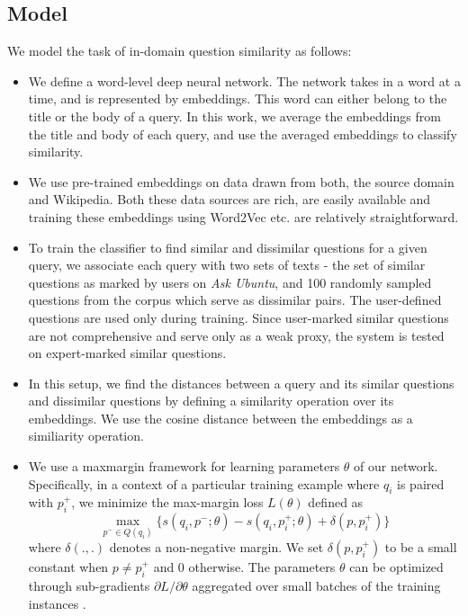 \documentclass{sigkddExp}
\begin{document}
\subsection{Model}
We model the task of in-domain question similarity as follows:
\begin{itemize}[topsep=0pt,itemsep=-1ex,partopsep=1ex,parsep=1ex]
  \item We define a word-level deep neural network. The network takes in a word at a time, and is represented by embeddings.  This word can either belong to the title or the body of a query. In this work, we average the embeddings from the title and body of each query, and use the averaged embeddings to classify similarity.
  \item We use pre-trained embeddings on data drawn from both, the source domain and Wikipedia. Both these data sources are rich, are easily available and training these embeddings using Word2Vec etc. are relatively straightforward.
  \item To train the classifier to find similar and dissimilar questions for a given query, we associate each query with two sets of texts - the set of similar questions as marked by users on \textit{Ask Ubuntu}, and 100 randomly sampled questions from the corpus which serve as dissimilar pairs. The user-defined questions are used only during training. Since user-marked similar questions are not comprehensive and serve only as a weak proxy, the system is tested on expert-marked similar questions.
  \item In this setup, we find the distances between a query and its similar questions and dissimilar questions by defining a similarity operation over its embeddings. We use the cosine distance between the embeddings as a similiarity operation.
  \item We use a maxmargin framework for learning parameters $\theta$ of our network. Specifically, in a context of a particular training example where $q_i$ is paired with $p^+_i$, we minimize the max-margin loss $L(\theta)$ defined as\\
  \begin{equation}
  \max_{p^- \in Q(q_i)} \{s(q_i,p^-;\theta) - s(q_i,p^+_i;\theta) + \delta(p, p^+_i)\}
  \end{equation}
where $\delta(.,.)$ denotes a non-negative margin. We set $\delta(p, p^+_i)$ to be a small constant when $p \neq p^+_i$ and 0 otherwise. The parameters $\theta$ can be optimized through sub-gradients ${\partial L}/{\partial \theta}$ aggregated over small batches of the training instances \cite{lei2015semi}.

\end{itemize}
\end{document}
